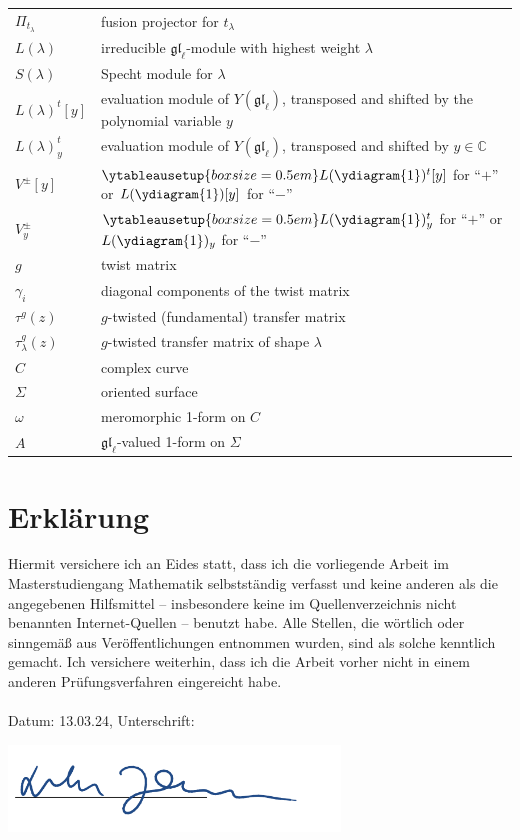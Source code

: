 \documentclass[11pt]{report}
\theoremstyle{definition}
\theoremstyle{remark}
\theoremstyle{remark}
\newcommand{\C}{\mathbb{C}}
\begin{document}
\begin{tabular}{l|l}
$\Pi_{t_\lambda}$ & fusion projector for $t_\lambda$ \\
$L(\lambda)$ & irreducible $\mathfrak{gl}_\ell$-module with highest weight $\lambda$ \\
$S(\lambda)$ & Specht module for $\lambda$ \\
$L(\lambda)^t[y]$ & evaluation module of $Y(\mathfrak{gl}_\ell)$, transposed and shifted by the polynomial variable $y$ \\
$L(\lambda)_y^t$ & evaluation module of $Y(\mathfrak{gl}_\ell)$, transposed and shifted by $y \in \C$ \\
$V^\pm[y]$ & $\ytableausetup{boxsize=0.5em}L(\ydiagram{1})^t[y]$ for “$+$” or $L(\ydiagram{1})[y]$ for “$-$” \\
$V_y^\pm$ & $\ytableausetup{boxsize=0.5em}L(\ydiagram{1})_y^t$ for “$+$” or $L(\ydiagram{1})_y$ for “$-$” \\
$g$ & twist matrix \\
$\gamma_i$ & diagonal components of the twist matrix \\
$\tau^g(z)$ & $g$-twisted (fundamental) transfer matrix \\
$\tau_\lambda^g(z)$ & $g$-twisted transfer matrix of shape $\lambda$ \\
$C$ & complex curve \\
$\Sigma$ & oriented surface \\
$\omega$ & meromorphic 1-form on $C$ \\
$A$ & $\mathfrak{gl}_\ell$-valued 1-form on $\Sigma$
\end{tabular}

\pagebreak

\printindex




\pagebreak

\section*{Erklärung}

Hiermit versichere ich an Eides statt, dass ich die vorliegende Arbeit im Masterstudiengang Mathematik selbstständig verfasst und keine anderen als die angegebenen Hilfsmittel – insbesondere keine im Quellenverzeichnis nicht benannten Internet-Quellen – benutzt habe. Alle Stellen, die wörtlich oder sinngemäß aus Veröffentlichungen entnommen wurden, sind als solche kenntlich gemacht. Ich versichere weiterhin, dass ich die Arbeit vorher nicht in einem anderen Prüfungsverfahren eingereicht habe.
~\\~\\
Datum: 13.03.24, Unterschrift:

\noindent\includegraphics[width=250pt]{signature.png}
\end{document}
